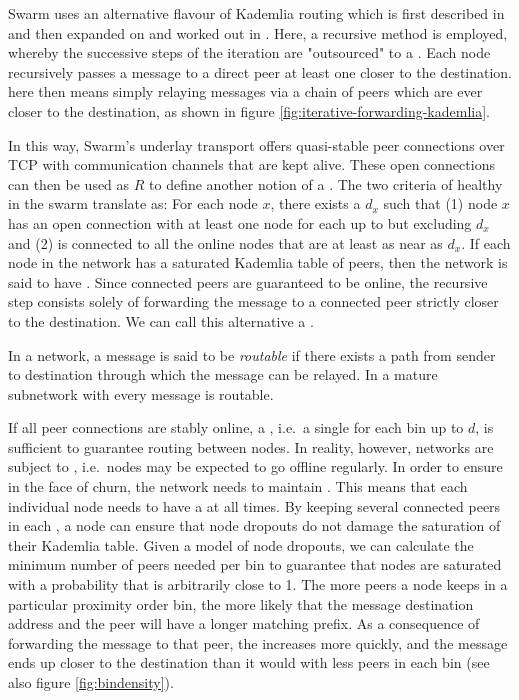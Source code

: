 Swarm uses an alternative flavour of Kademlia routing which is first described in \cite{heep2010r} and then expanded on and worked out in \cite{tronetal2019-network}. Here, a recursive method is employed, whereby the successive steps of the iteration are "outsourced" to a .
Each node recursively passes a message to a direct peer at least one  closer to the destination.  here then means simply relaying messages via a chain of peers which are ever closer to the destination, as shown in figure \ref{fig:iterative-forwarding-kademlia}.


In this way, Swarm's underlay transport offers quasi-stable peer connections over TCP with communication channels that are kept alive. These open connections can then be used as $R$ to define another notion of a . The two criteria of healthy  in the swarm translate as: For each node $x$, there exists a  $d_x$ such that (1) node $x$ has an open connection with at least one node for each  up to but excluding $d_x$ and (2) is connected to all the online nodes that are at least as near as $d_x$. If each node in the network has a saturated Kademlia table of peers, then the network is said to have . Since connected peers are guaranteed to be online, the recursive step consists solely of forwarding the message to a connected peer strictly closer to the destination. We can call this alternative a .


In a  network, a message is said to be \emph{routable} if there exists a path from sender to destination through which the message can be relayed. In a mature subnetwork with  every message is routable. 

If all peer connections are stably online, a , i.e.\ a single  for each bin up to $d$, is sufficient to guarantee routing between nodes. In reality, however, networks are subject to , i.e.\ nodes may be expected to go offline regularly. In order to ensure  in the face of churn, the network needs to maintain . This means that each individual node needs to have a  at all times. By keeping several connected peers in each , a node can ensure that node dropouts do not damage the saturation of their Kademlia table. Given a model of node dropouts, we can calculate the minimum number of peers needed per bin to guarantee that nodes are saturated with a probability that is arbitrarily close to 1. The more peers a node keeps in a particular proximity order bin, the more likely that the message destination address and the peer will have a longer matching prefix. As a consequence of forwarding the message to that peer, the  increases more quickly, and the message ends up closer to the destination than it would with less peers in each bin (see also figure \ref{fig:bindensity}).




